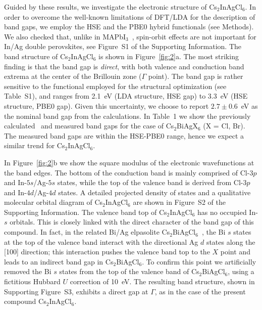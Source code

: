 \documentclass[journal=jpcl,manuscript=letter,layout=traditional]{achemso}
\begin{document}
Guided by these results, we investigate the electronic structure of Cs$_2$InAgCl$_6$.
In order to overcome the well-known limitations of DFT/LDA for the description of band gaps,
we employ the HSE and the PBE0 hybrid functionals (see Methods). We also checked that,
unlike in MAPbI$_3$~\cite{Even2013}, spin-orbit effects are not important for In/Ag double perovskites,
see Figure~S1 of the Supporting Information. The band structure of Cs$_2$InAgCl$_6$ is shown
in Figure~\ref{fig:2}a. The most striking finding is that the band gap is {\it direct},
with both valence and conduction band extrema at the center of the Brillouin zone ($\Gamma$ point).
The band gap is rather sensitive to the functional
employed for the structural optimization (see Table~S1), and ranges from 2.1~eV (LDA structure,
HSE gap) to 3.3~eV (HSE structure, PBE0 gap). Given this uncertainty, we choose to report
$2.7\pm0.6$~eV as the nominal band gap from the calculations. In Table~1 we
show the previously calculated~\cite{Volonakis2016,Filip2016b} and measured
\cite{Volonakis2016,Filip2016b,Slavney2016,McClure2016} band gaps for the case of Cs$_2$BiAgX$_6$
(X = Cl, Br). The measured band gaps are within the HSE-PBE0 range, hence we expect a similar trend
for Cs$_2$InAgCl$_6$.

In Figure~\ref{fig:2}b we show the square modulus of the electronic wavefunctions at the band
edges. The bottom of the conduction band is mainly comprised of Cl-$3p$ and In-$5s$/Ag-$5s$ states,
while the top of the valence band is derived from Cl-$3p$ and In-$4d$/Ag-$4d$ states.
A detailed projected density of states and a qualitative molecular orbital diagram of
Cs$_2$InAgCl$_6$ are shown in Figure~S2 of the Supporting Information.
The valence band top of Cs$_2$InAgCl$_6$ has no occupied In-$s$ orbitals. This  is closely
linked with the direct character of the band gap of this
compound. In fact, in the related Bi/Ag elpasolite Cs$_2$BiAgCl$_6$~\cite{Volonakis2016,Filip2016b},
the Bi $s$ states at the top of the valence band interact with the directional Ag $d$ states
along the [100] direction; this interaction pushes the valence band top to the $X$ point
and leads to an indirect band gap in Cs$_2$BiAgCl$_6$. To confirm this point we artificially removed the
Bi $s$ states from the top of the valence band of  Cs$_2$BiAgCl$_6$, using a fictitious
Hubbard $U$ correction of 10~eV. The resulting band structure, shown
in Supporting Figure~S3, exhibits a direct gap at $\Gamma$, as in the case of the
present compound Cs$_2$InAgCl$_6$.
\end{document}
